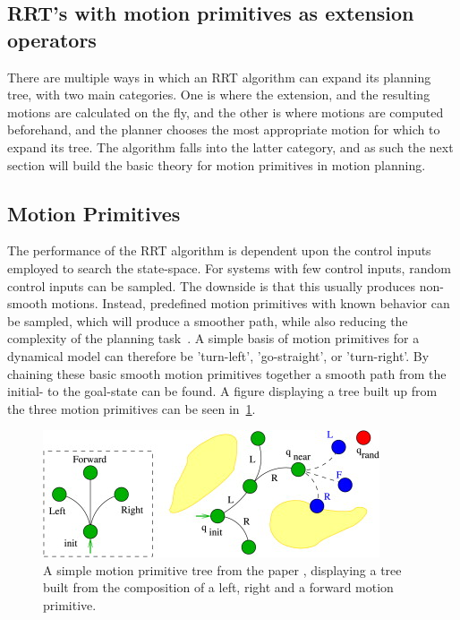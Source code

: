 %   

\subsection{RRT's with motion primitives as extension operators}

There are multiple ways in which an \ac{RRT} algorithm can expand its planning
tree, with two main categories. One is where the extension, and the resulting
motions are calculated on the fly, and the other is where motions are computed
beforehand, and the planner chooses the most appropriate motion for which to
expand its tree. The \rrtfunnel{} algorithm falls into the latter category, and
as such the next section will build the basic theory for motion primitives in
motion planning.

\subsection{Motion Primitives}

The performance of the \ac{RRT} algorithm is dependent upon the control inputs
employed to search the state-space. For systems with few control inputs, random
control inputs can be sampled. The downside is that this usually produces
non-smooth motions. Instead, predefined motion primitives with known behavior
can be sampled, which will produce a smoother path, while also reducing the
complexity of the planning
task~\cite{vonasekGlobalMotionPlanning2013,hauserUsingMotionPrimitives2008}. A
simple basis of motion primitives for a dynamical model can therefore be
'turn-left', 'go-straight', or 'turn-right'. By chaining these basic smooth
motion primitives together a smooth path from the initial- to the goal-state can
be found. A figure displaying a tree built up from the three motion primitives
can be seen in~\cref{fig:motion-primitive-tree}.

\begin{figure}
  \centering
  \includegraphics[scale=1]{figures/preliminaries/motion-primitive-tree}
  \caption{A simple motion primitive tree from the paper
    \textcite{vonasekHighlevelMotionPlanning2015}, displaying a tree built from
    the composition of a left, right and a forward motion primitive.}
  \label{fig:motion-primitive-tree}
\end{figure}


